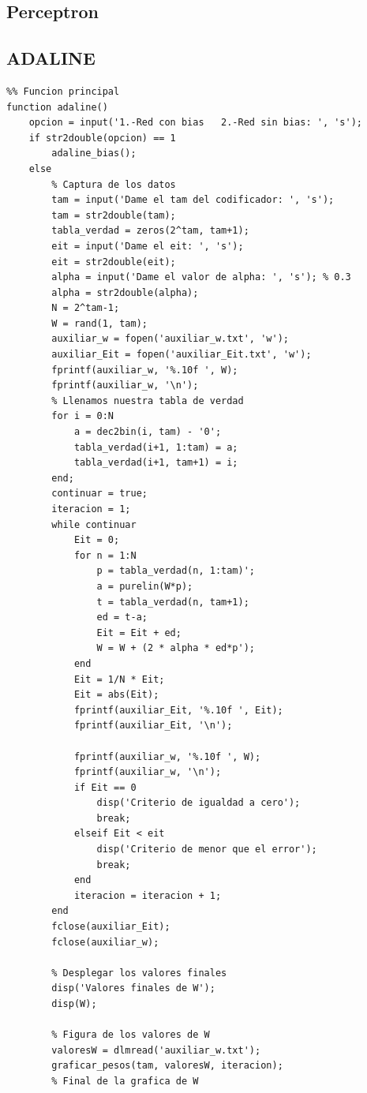 \documentclass[12pt, titlepage]{article}
\begin{document}
        \subsection{Perceptron}
        \subsection{ADALINE}
        \begin{lstlisting}
%% Funcion principal
function adaline()
    opcion = input('1.-Red con bias   2.-Red sin bias: ', 's');
    if str2double(opcion) == 1
        adaline_bias();
    else
        % Captura de los datos
        tam = input('Dame el tam del codificador: ', 's');
        tam = str2double(tam);
        tabla_verdad = zeros(2^tam, tam+1);
        eit = input('Dame el eit: ', 's');
        eit = str2double(eit);
        alpha = input('Dame el valor de alpha: ', 's'); % 0.3
        alpha = str2double(alpha);
        N = 2^tam-1;
        W = rand(1, tam);
        auxiliar_w = fopen('auxiliar_w.txt', 'w');
        auxiliar_Eit = fopen('auxiliar_Eit.txt', 'w');
        fprintf(auxiliar_w, '%.10f ', W);
        fprintf(auxiliar_w, '\n');
        % Llenamos nuestra tabla de verdad
        for i = 0:N
            a = dec2bin(i, tam) - '0';
            tabla_verdad(i+1, 1:tam) = a;
            tabla_verdad(i+1, tam+1) = i;
        end;
        continuar = true;
        iteracion = 1;
        while continuar
            Eit = 0;
            for n = 1:N
                p = tabla_verdad(n, 1:tam)';
                a = purelin(W*p);
                t = tabla_verdad(n, tam+1);
                ed = t-a;
                Eit = Eit + ed;
                W = W + (2 * alpha * ed*p');
            end
            Eit = 1/N * Eit;
            Eit = abs(Eit);
            fprintf(auxiliar_Eit, '%.10f ', Eit);
            fprintf(auxiliar_Eit, '\n');
        
            fprintf(auxiliar_w, '%.10f ', W);
            fprintf(auxiliar_w, '\n');
            if Eit == 0
                disp('Criterio de igualdad a cero');
                break;
            elseif Eit < eit
                disp('Criterio de menor que el error');
                break;
            end
            iteracion = iteracion + 1;
        end
        fclose(auxiliar_Eit);
        fclose(auxiliar_w);
    
        % Desplegar los valores finales
        disp('Valores finales de W');
        disp(W);
        
        % Figura de los valores de W
        valoresW = dlmread('auxiliar_w.txt');
        graficar_pesos(tam, valoresW, iteracion);
        % Final de la grafica de W
        

\end{lstlisting}
\end{document}
